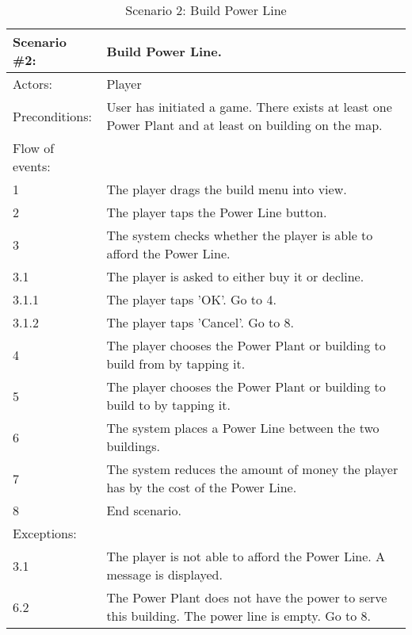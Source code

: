 \begin{table}
	\begin{tabular}{| l | p{10cm} |}
		\hline
		\rowcolor{lightgray}
		{\bf Scenario \#2:} & {\bf Build Power Line.} \\ \hline
		Actors: & Player \\ \hline
		Preconditions: & User has initiated a game. There exists at least one Power Plant and at least on building on the map. \\ \hline
		\rowcolor{lightergray}
		Flow of events: & \\ \hline
		1 & The player drags the build menu into view. \\ \hline
		2 & The player taps the Power Line button. \\ \hline
		3 & The system checks whether the player is able to afford the Power Line. \\ \hline
		3.1 & The player is asked to either buy it or decline. \\ \hline
		3.1.1 & The player taps 'OK'. Go to 4. \\ \hline
		3.1.2 & The player taps 'Cancel'. Go to 8. \\ \hline
		4 & The player chooses the Power Plant or building to build from by tapping it. \\ \hline
		5 & The player chooses the Power Plant or building to build to by tapping it. \\ \hline 
		6 & The system places a Power Line between the two buildings. \\ \hline
		7 & The system reduces the amount of money the player has by the cost of the Power Line. \\ \hline
		8 & End scenario. \\ \hline
		\rowcolor{lightergray}
		Exceptions: & \\ \hline
		3.1 & The player is not able to afford the Power Line. A message is displayed. \\ \hline
		6.2 & The Power Plant does not have the power to serve this building. The power line is empty. Go to 8. \\ \hline
	\end{tabular}
\caption{Scenario 2: Build Power Line}
\end{table}

